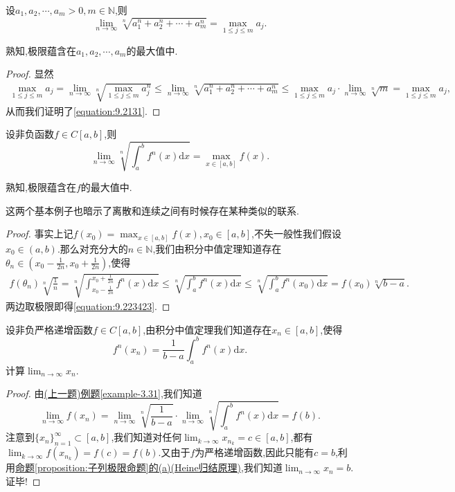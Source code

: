 \documentclass[../../main.tex]{subfiles}
\begin{document}
\begin{example}
设\(a_1,a_2,\cdots,a_m > 0,m \in \mathbb{N}\),则
\[
\lim_{n \to \infty} \sqrt[n]{a_1^n + a_2^n + \cdots + a_m^n} = \max_{1\leq j\leq m} a_j.
\]
\end{example} 
\begin{remark}
熟知,极限蕴含在\(a_1,a_2,\cdots,a_m\)的最大值中.
\end{remark}
\begin{proof}
显然
\begin{align}\label{equation:9.2131}
\max_{1\leq j\leq m} a_j = \lim_{n \to \infty} \sqrt[n]{\max_{1\leq j\leq m} a_j^n} \leq \lim_{n \to \infty} \sqrt[n]{a_1^n + a_2^n + \cdots + a_m^n} \leq \max_{1\leq j\leq m} a_j \cdot \lim_{n \to \infty} \sqrt[n]{m} = \max_{1\leq j\leq m} a_j,
\end{align}
从而我们证明了\eqref{equation:9.2131}.  
\end{proof}

\begin{example}\label{example-3.31}
设非负函数\(f \in C[a,b]\),则
\[
\lim_{n \to \infty} \sqrt[n]{\int_{a}^{b} f^n(x)\mathrm{d}x} = \max_{x\in[a,b]} f(x).
\]
\end{example}
\begin{remark}
熟知,极限蕴含在\(f\)的最大值中. 
\end{remark}
\begin{note}
这两个基本例子也暗示了离散和连续之间有时候存在某种类似的联系.
\end{note}
\begin{proof}
事实上记\(f(x_0) = \max_{x\in[a,b]} f(x), x_0 \in [a,b]\),不失一般性我们假设\(x_0 \in (a,b)\).那么对充分大的\(n \in \mathbb{N}\),我们由积分中值定理知道存在\(\theta_n \in (x_0 - \frac{1}{2n}, x_0 + \frac{1}{2n})\),使得
\begin{align}\label{equation:9.223423}
f(\theta_n) \sqrt[n]{\frac{1}{n}} = \sqrt[n]{\int_{x_0 - \frac{1}{2n}}^{x_0 + \frac{1}{2n}} f^n(x)\mathrm{d}x} \leq \sqrt[n]{\int_{a}^{b} f^n(x)\mathrm{d}x} \leq \sqrt[n]{\int_{a}^{b} f^n(x_0)\mathrm{d}x} = f(x_0) \sqrt[n]{b - a}.   
\end{align}
两边取极限即得\eqref{equation:9.223423}.
\end{proof}

\begin{example}
设非负严格递增函数\(f \in C[a,b]\),由积分中值定理我们知道存在\(x_n \in [a,b]\),使得
\[
f^n(x_n) = \frac{1}{b - a} \int_{a}^{b} f^n(x)\mathrm{d}x.
\]
计算\(\lim_{n \to \infty} x_n\).
\end{example}
\begin{proof}
由\hyperref[example-3.31]{(上一题)例题\ref{example-3.31}},我们知道
\[
\lim_{n \to \infty} f(x_n) = \lim_{n \to \infty} \sqrt[n]{\frac{1}{b - a}} \cdot \lim_{n \to \infty} \sqrt[n]{\int_{a}^{b} f^n(x)\mathrm{d}x} = f(b).
\]
注意到\(\{x_n\}_{n = 1}^{\infty} \subset [a,b]\),我们知道对任何\(\lim_{k \to \infty} x_{n_k} = c \in [a,b]\),都有\(\lim_{k \to \infty} f(x_{n_k}) = f(c) = f(b)\).又由于$f$为严格递增函数,因此只能有\(c = b\),利用\hyperref[proposition:子列极限命题]{命题\ref{proposition:子列极限命题}的(a)(Heine归结原理)},我们知道\(\lim_{n \to \infty} x_n = b\).证毕!
\end{proof}
\end{document}

